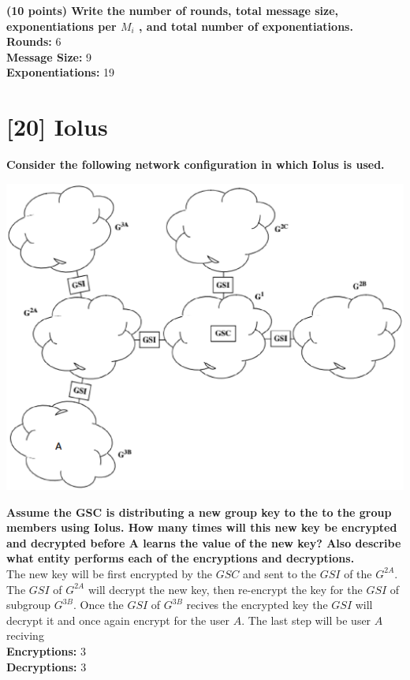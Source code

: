 \documentclass[letterpaper,11pt,notitlepage,fleqn]{article}
\begin{document}
\noindent\textbf{(10 points) Write the number of rounds, total message size, exponentiations per $M_i$ , and total number of exponentiations.} \\
\textbf{Rounds:} 6\\
\textbf{Message Size:} 9\\
\textbf{Exponentiations:} 19\\

\section{[20] Iolus}
\noindent\textbf{Consider the following network conﬁguration in which Iolus is used.}
\begin{center}
    \includegraphics[scale=0.5]{one.eps}
\end{center}
\noindent\textbf{Assume the GSC is distributing a new group key to the to the group members using Iolus. How many times will this new key be encrypted and decrypted before A learns the value of the new key? Also describe what entity performs each of the encryptions and decryptions.} \\
The new key will be first encrypted by the $GSC$ and sent to the $GSI$ of the $G^{2A}$. The $GSI$ of $G^{2A}$ will decrypt the new key, then re-encrypt the key for the $GSI$ of subgroup $G^{3B}$. Once the $GSI$ of $G^{3B}$ recives the encrypted key the $GSI$ will decrypt it and once again encrypt for the user $A$. The last step will be user $A$ reciving \\
\textbf{Encryptions:} 3 \\
\textbf{Decryptions:} 3 \\
\end{document}
